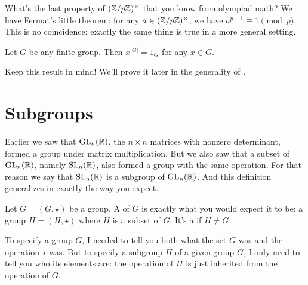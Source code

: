 What's the last property of $(\mathbb Z/p\mathbb Z)^\times$ that you know from olympiad math?
We have Fermat's little theorem: for any $a \in (\mathbb Z/p\mathbb Z)^\times$,
we have $a^{p-1} \equiv 1 \pmod p$.
This is no coincidence:
exactly the same thing is true in a more general setting.

\begin{theorem}
	Let $G$ be any finite group.
	Then $x^{\left\lvert G \right\rvert} = 1_G$ for any $x \in G$.
\end{theorem}
Keep this result in mind! We'll prove it later in
the generality of .

\section{Subgroups}
Earlier we saw that $\operatorname{GL}_n(\mathbb R)$, the $n \times n$ matrices with nonzero determinant, formed a group under matrix multiplication.
But we also saw that a subset of $\operatorname{GL}_n(\mathbb R)$, namely $\operatorname{SL}_n(\mathbb R)$, also formed a group with the same operation.
For that reason we say that $\operatorname{SL}_n(\mathbb R)$ is a subgroup of $\operatorname{GL}_n(\mathbb R)$.
And this definition generalizes in exactly the way you expect.

\begin{definition}
	Let $G = (G, \star)$ be a group.
	A  of $G$ is exactly what you would expect it to be:
	a group $H = (H, \star)$ where $H$ is a subset of $G$.
	It's a  if $H \neq G$.
\end{definition}

\begin{remark}
	To specify a group $G$, I needed to tell you both what the set $G$ was and the operation $\star$ was.
	But to specify a subgroup $H$ of a given group $G$, I only need to tell you who its elements are: the operation of $H$ is just inherited from the operation of $G$.
\end{remark}

